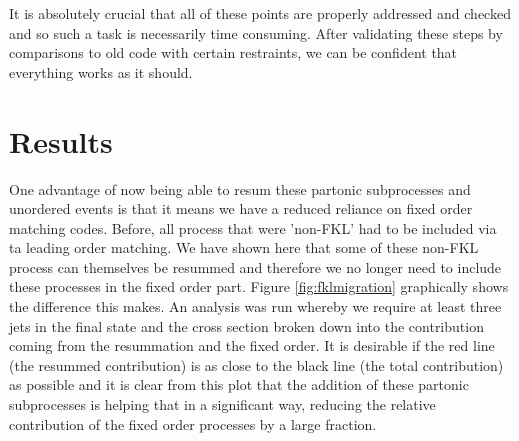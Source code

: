 It is absolutely crucial that all of these points are properly addressed and checked and so such a task is necessarily time consuming. After validating these steps by comparisons to old code with certain restraints, we can be confident that everything works as it should. %
\section{Results}
One advantage of now being able to resum these partonic subprocesses and unordered events is that it means we have a reduced reliance on fixed order matching codes. Before, all process that were 'non-FKL' had to be included via ta leading order matching. We have shown here that some of these non-FKL process can themselves be resummed and therefore we no longer need to include these processes in the fixed order part. Figure \ref{fig:fklmigration} graphically shows the difference this makes. An analysis was run whereby we require at least three jets in the final state and the cross section broken down into the contribution coming from the resummation and the fixed order. It is desirable if the red line (the resummed contribution) is as close to the black line (the total contribution) as possible and it is clear from this plot that the addition of these partonic subprocesses is helping that in a significant way, reducing the relative contribution of the fixed order processes by a large fraction.  

